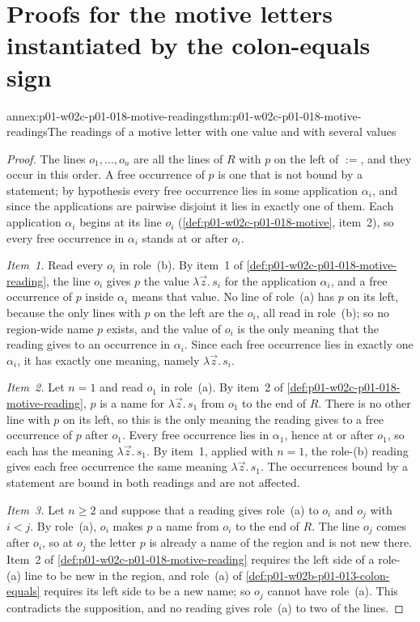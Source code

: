 \section{Proofs for the motive letters instantiated by the colon-equals sign}
\label{sec:annex-p01-w02c-p01-018-motives}

\begin{annexitem}{annex:p01-w02c-p01-018-motive-readings}{thm:p01-w02c-p01-018-motive-readings}{The readings of a motive letter with one value and with several values}
\begin{proof}
The lines \(o_1,\ldots,o_n\) are all the lines of \(R\) with \(p\) on the
left of \(:=\), and they occur in this order.  A free occurrence of \(p\)
is one that is not bound by a statement; by hypothesis every free
occurrence lies in some application \(\alpha_i\), and since the
applications are pairwise disjoint it lies in exactly one of them.  Each
application \(\alpha_i\) begins at its line \(o_i\)
(\cref{def:p01-w02c-p01-018-motive}, item~2), so every free occurrence in
\(\alpha_i\) stands at or after \(o_i\).

\emph{Item~1.}  Read every \(o_i\) in role~(b).  By item~1 of
\cref{def:p01-w02c-p01-018-motive-reading}, the line \(o_i\) gives \(p\)
the value \(\lambda\vec z.\,s_i\) for the application \(\alpha_i\), and a
free occurrence of \(p\) inside \(\alpha_i\) means that value.  No line of
role~(a) has \(p\) on its left, because the only lines with \(p\) on the
left are the \(o_i\), all read in role~(b); so no region-wide name \(p\)
exists, and the value of \(o_i\) is the only meaning that the reading gives
to an occurrence in \(\alpha_i\).  Since each free occurrence lies in
exactly one \(\alpha_i\), it has exactly one meaning, namely
\(\lambda\vec z.\,s_i\).

\emph{Item~2.}  Let \(n=1\) and read \(o_1\) in role~(a).  By item~2 of
\cref{def:p01-w02c-p01-018-motive-reading}, \(p\) is a name for
\(\lambda\vec z.\,s_1\) from \(o_1\) to the end of \(R\).  There is no other
line with \(p\) on its left, so this is the only meaning the reading gives
to a free occurrence of \(p\) after \(o_1\).  Every free occurrence lies in
\(\alpha_1\), hence at or after \(o_1\), so each has the meaning
\(\lambda\vec z.\,s_1\).  By item~1, applied with \(n=1\), the role-(b)
reading gives each free occurrence the same meaning
\(\lambda\vec z.\,s_1\).  The occurrences bound by a statement are bound
in both readings and are not affected.

\emph{Item~3.}  Let \(n\geq2\) and suppose that a reading gives role~(a)
to \(o_i\) and \(o_j\) with \(i<j\).  By role~(a), \(o_i\) makes \(p\) a
name from \(o_i\) to the end of \(R\).  The line \(o_j\) comes after
\(o_i\), so at \(o_j\) the letter \(p\) is already a name of the region and
is not new there.  Item~2 of \cref{def:p01-w02c-p01-018-motive-reading}
requires the left side of a role-(a) line to be new in the region, and
role~(a) of \cref{def:p01-w02b-p01-013-colon-equals} requires its left side
to be a new name; so \(o_j\) cannot have role~(a).  This contradicts the
supposition, and no reading gives role~(a) to two of the lines.


\end{proof}
\end{annexitem}
